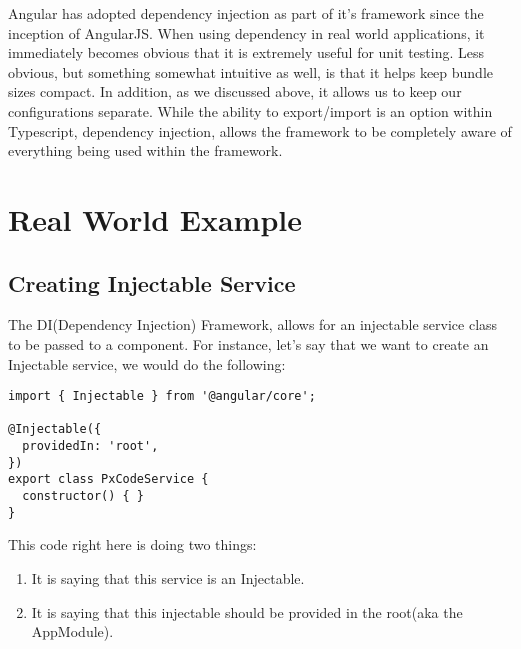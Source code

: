 Angular has adopted dependency injection as part of it's framework since the
inception of AngularJS. When using dependency in real world applications, it
immediately becomes obvious that it is extremely useful for unit testing. Less obvious, but something somewhat intuitive as well, is that it helps keep bundle
sizes compact. In addition, as we discussed above, it allows us to keep our
configurations separate. While the ability to export/import is an option within
Typescript, dependency injection, allows the framework to be completely aware
of everything being used within the framework.

\section{ Real World Example }

\subsection{ Creating Injectable Service }
The DI(Dependency Injection) Framework, allows for an injectable service class
to be passed to a component. For instance, let's say that we want to create an
Injectable service, we would do the following:
\begin{lstlisting}
import { Injectable } from '@angular/core';

@Injectable({
  providedIn: 'root',
})
export class PxCodeService {
  constructor() { }
}
\end{lstlisting}

This code right here is doing two things:
\begin{enumerate}
  \item It is saying that this service is an Injectable.
  \item It is saying that this injectable should be provided in the root(aka the
  AppModule).
\end{enumerate}


